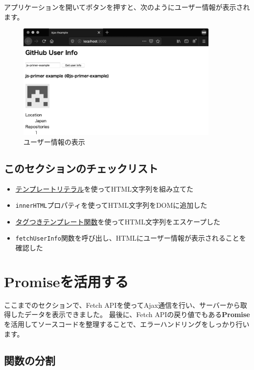 アプリケーションを開いてボタンを押すと、次のようにユーザー情報が表示されます。

\begin{figure}[h]
\centering
\includegraphics[width=100mm]{fig/fig-4.eps}
\caption{ユーザー情報の表示}
\end{figure}

\hypertarget{section-checklist}{%
\subsection{このセクションのチェックリスト}\label{section-checklist}}

\begin{itemize}
\item
  \hyperlink{create}{テンプレートリテラル}を使ってHTML文字列を組み立てた
\item
  \texttt{innerHTML}プロパティを使ってHTML文字列をDOMに追加した
\item
  \hyperlink{tagged-template-function}{タグつきテンプレート関数}を使ってHTML文字列をエスケープした
\item
  \texttt{fetchUserInfo}関数を呼び出し、HTMLにユーザー情報が表示されることを確認した
\end{itemize}

\hypertarget{use-promise}{%
\section{Promiseを活用する}\label{use-promise}}

ここまでのセクションで、Fetch
APIを使ってAjax通信を行い、サーバーから取得したデータを表示できました。
最後に、Fetch
APIの戻り値でもある\textbf{Promise}を活用してソースコードを整理することで、エラーハンドリングをしっかり行います。

\hypertarget{split-function}{%
\subsection{関数の分割}\label{split-function}}

